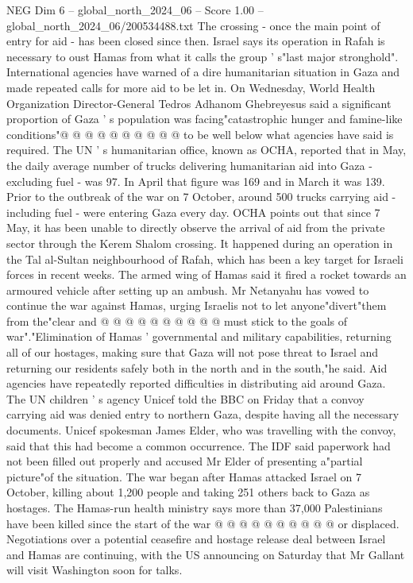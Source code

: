 \begin{textsample}{NEG Dim 6 – global\_north\_2024\_06 – Score 1.00 – global\_north\_2024\_06/200534488.txt}
The crossing - once the main point of entry for aid - has been closed since then.
Israel says its operation in Rafah is necessary to oust Hamas from what it calls the group ' s"last major stronghold".
International agencies have warned of a dire humanitarian situation in Gaza and made repeated calls for more aid to be let in.
On Wednesday, World Health Organization Director-General Tedros Adhanom Ghebreyesus said a significant proportion of Gaza ' s population was facing"catastrophic hunger and famine-like conditions"@ @ @ @ @ @ @ @ @ @ to be well below what agencies have said is required.
The UN ' s humanitarian office, known as OCHA, reported that in May, the daily average number of trucks delivering humanitarian aid into Gaza - excluding fuel - was 97.
In April that figure was 169 and in March it was 139.
Prior to the outbreak of the war on 7 October, around 500 trucks carrying aid - including fuel - were entering Gaza every day.
OCHA points out that since 7 May, it has been unable to directly observe the arrival of aid from the private sector through the Kerem Shalom crossing.
It happened during an operation in the Tal al-Sultan neighbourhood of Rafah, which has been a key target for Israeli forces in recent weeks.
The armed wing of Hamas said it fired a rocket towards an armoured vehicle after setting up an ambush.
Mr Netanyahu has vowed to continue the war against Hamas, urging Israelis not to let anyone"divert"them from the"clear and @ @ @ @ @ @ @ @ @ @ must stick to the goals of war"."Elimination of Hamas ' governmental and military capabilities, returning all of our hostages, making sure that Gaza will not pose threat to Israel and returning our residents safely both in the north and in the south,"he said.
Aid agencies have repeatedly reported difficulties in distributing aid around Gaza.
The UN children ' s agency Unicef told the BBC on Friday that a convoy carrying aid was denied entry to northern Gaza, despite having all the necessary documents.
Unicef spokesman James Elder, who was travelling with the convoy, said that this had become a common occurrence.
The IDF said paperwork had not been filled out properly and accused Mr Elder of presenting a"partial picture"of the situation.
The war began after Hamas attacked Israel on 7 October, killing about 1,200 people and taking 251 others back to Gaza as hostages.
The Hamas-run health ministry says more than 37,000 Palestinians have been killed since the start of the war @ @ @ @ @ @ @ @ @ @ or displaced.
Negotiations over a potential ceasefire and hostage release deal between Israel and Hamas are continuing, with the US announcing on Saturday that Mr Gallant will visit Washington soon for talks.

\end{textsample}
